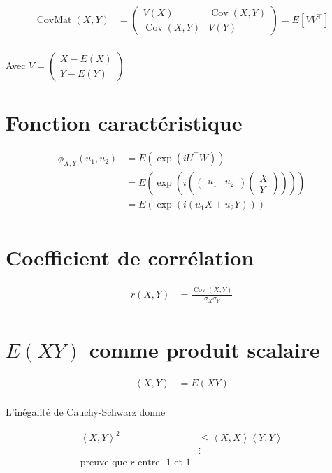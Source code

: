 \documentclass{article}
\begin{document}
\begin{align*}
	\operatorname{CovMat}(X, Y) &= \begin{pmatrix} 
	V(X) & \operatorname{Cov}(X, Y)  \\
	\operatorname{Cov}(X, Y) & V(Y) 
\end{pmatrix} = E[VV^{\top}] \\
\end{align*}

Avec $V = \begin{pmatrix} X - E(X) \\ Y-E(Y) \end{pmatrix} $

\section{Fonction caractéristique}

\begin{align*}
	\phi_{X, Y}(u_1, u_2) &= E(\exp(iU^{\top}W)) \\
			      &= E(\exp(i\left( \begin{pmatrix} u_1 & u_2 \end{pmatrix} \begin{pmatrix} X\\ Y \end{pmatrix}   \right) )) \\
			      &= E(\exp(i(u_1 X + u_2 Y))) \\
\end{align*}

\section{Coefficient de corrélation}

\begin{align*}
	r(X, Y) &= \frac{\operatorname{Cov}(X, Y)}{\sigma_X \sigma_Y} \\
\end{align*}

\section{$E(XY)$ comme produit scalaire}


\begin{align*}
	\left<X, Y \right> &= E(XY) \\
\end{align*}

L'inégalité de Cauchy-Schwarz donne

\begin{align*}
	\left<X, Y \right> ^2 &\le \left<X, X \right>  \left<Y, Y \right> \\
			      &	\vdots \\
			      \text{preuve que $r$ entre -1 et 1}

\end{align*}
\end{document}
